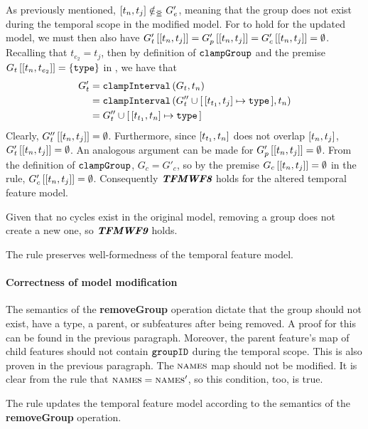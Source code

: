    As previously mentioned, $\interval{t_n}{t_j} \notinnr G'_e$, meaning that the group does not exist during the temporal scope in the modified model. For  to hold for the updated model, we must then also have $\lookup{G'_t}{\interval{t_n}{t_j}} = \lookup{G'_p}{\interval{t_n}{t_j}} = \lookup{G'_c}{\interval{t_n}{t_j}} = \emptyset$. Recalling that $t_{e_2} = t_j$, then by definition of $\texttt{clampGroup}$ and the premise $\lookup{G_t}{\interval{t_n}{t_{e_2}}} = \set{\var{type}}$ in , we have that
\begin{align*}
   G'_t &= \var{clampInterval}\left(G_t, t_n\right) \\
        &= \var{clampInterval}\left(G''_t \cup \intervalmapping{t_{t_1}}{t_j}{\var{type}}, t_n\right) \\
        &= G''_t \cup \intervalmapping{t_{t_1}}{t_n}{\var{type}}
\end{align*}
Clearly, $\lookup{G''_t}{\interval{t_n}{t_j}} = \emptyset$.  Furthermore, since $\interval{t_{t_1}}{t_n}$ does not overlap $\interval{t_n}{t_j}$, $\lookup{G'_t}{\interval{t_n}{t_j}} = \emptyset$. An analogous argument can be made for $\lookup{G'_p}{\interval{t_n}{t_j}} = \emptyset$. From the definition of $\texttt{clampGroup}$, $G_c = G'_c$, so by the premise $\lookup{G_c}{\interval{t_n}{t_j}} = \emptyset$ in the rule, $\lookup{G_c'}{\interval{t_n}{t_j}} = \emptyset$. Consequently $\textit{\textbf{TFMWF8}}$ holds for the altered temporal feature model.

Given that no cycles exist in the original model, removing a group does not create a new one, so $\textit{\textbf{TFMWF9}}$ holds.
\\

\begin{lemma}
   The  rule preserves well-formedness of the temporal feature model.
   \label{lemma:remove-group-well-formed}
\end{lemma}

\paragraph{Correctness of model modification}
The semantics of the \textbf{removeGroup} operation dictate that the group should not exist, have a type, a parent, or subfeatures after being removed. A proof for this can be found in the previous paragraph. Moreover, the parent feature's map of child features should not contain $\texttt{groupID}$ during the temporal scope. This is also proven in the previous paragraph. The $\textsc{names}{}$ map should not be modified. It is clear from the rule that $\textsc{names}{} = \textsc{names}{}'$, so this condition, too, is true.
\\

\begin{lemma}
   The  rule updates the temporal feature model according to the semantics of the \textbf{removeGroup} operation.
   \label{lemma:remove-group-mod}
\end{lemma}

